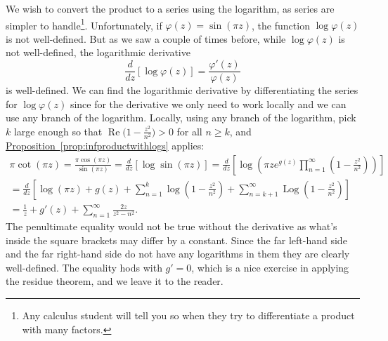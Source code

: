 \documentclass[12pt,openany]{book}
\renewcommand{\Re}{\operatorname{Re}}
\newcommand{\Log}{\operatorname{Log}}
\theoremstyle{plain}
\theoremstyle{remark}
\theoremstyle{definition}
\theoremstyle{exercise}
\theoremstyle{example}
\newcommand{\propref}[1]{\hyperref[#1]{Proposition~\ref*{#1}}}
\begin{document}
We wish to convert the product to a series using the
logarithm, as series are simpler to handle\footnote{Any calculus student
will tell you so when they try to differentiate a product with many
factors.}.  Unfortunately, if $\varphi(z) =
\sin(\pi z)$, the function
$\log \varphi(z)$ is not well-defined.
But as we saw a couple of times before, while $\log \varphi(z)$ is not
well-defined, the logarithmic derivative
\begin{equation*}
\frac{d}{dz} \left[
\log \varphi(z)
\right]
=
\frac{\varphi'(z)}{\varphi(z)}
\end{equation*}
is well-defined.  We can find the logarithmic derivative by differentiating
the series for $\log \varphi(z)$
since for the derivative we only need to work locally and we can use
any branch of the logarithm.
Locally, using any branch of the logarithm,
pick $k$ large enough so that $\Re \bigl( 1-\frac{z^2}{n^2} \bigr) > 0$
for all $n \geq k$, and
\propref{prop:infproductwithlogs} applies:
\begin{multline*}
\pi \cot (\pi z) =
\frac{\pi \cos (\pi z)}{\sin(\pi z)}
=
\frac{d}{dz} \left[
\log \sin (\pi z)
\right]
=
\frac{d}{dz} \left[
\log 
\left(
\pi z
e^{g(z)}
\prod_{n=1}^\infty 
\left(1-\frac{z^2}{n^2}\right)
\right)
\right]
\\
=
\frac{d}{dz} \left[
\log(\pi z)
+
g(z)
+
\sum_{n=1}^k 
\log
\left(1-\frac{z^2}{n^2}\right)
+
\sum_{n=k+1}^\infty
\Log
\left(1-\frac{z^2}{n^2}\right)
\right]
\\
=
\frac{1}{z}
+
g'(z)
+
\sum_{n=1}^\infty 
\frac{2z}{z^2-n^2} .
\end{multline*}
The penultimate equality would not be true without the derivative as what's
inside the square brackets may differ by a constant.
Since the far left-hand side and the far right-hand side do not have any
logarithms in them they are clearly well-defined.
The equality hods with $g'=0$, which is 
a nice exercise in applying the residue theorem, and we
leave it to the reader.
\end{document}
